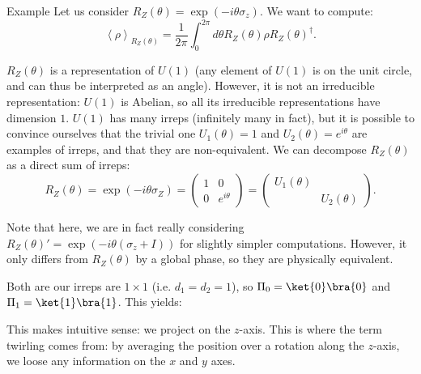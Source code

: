 \documentclass[a4paper]{article}
\begin{document}
\begin{parag}{Example}
    Let us consider $R_Z\left(\theta\right) = \exp\left(-i \theta \sigma_z\right)$.  We want to compute:
    \[\left\langle \rho \right\rangle_{R_Z\left(\theta\right)} = \frac{1}{2\pi} \int_{0}^{2\pi} d \theta R_Z\left(\theta\right) \rho R_Z\left(\theta\right)^{\dagger}.\]

    $R_Z\left(\theta\right)$ is a representation of $U\left(1\right)$ (any element of $U\left(1\right)$ is on the unit circle, and can thus be interpreted as an angle). However, it is not an irreducible representation: $U\left(1\right)$ is Abelian, so all its irreducible representations have dimension $1$. $U\left(1\right)$ has many irreps (infinitely many in fact), but it is possible to convince ourselves that the trivial one $U_1\left(\theta\right) = 1$ and $U_2\left(\theta\right) = e^{i \theta}$ are examples of irreps, and that they are non-equivalent. We can decompose $R_Z\left(\theta\right)$ as a direct sum of irreps: 
    \[R_Z\left(\theta\right) = \exp\left(-i \theta \sigma_Z\right) = \begin{pmatrix} 1 & 0 \\ 0 & e^{i \theta} \end{pmatrix} = \begin{pmatrix} U_1\left(\theta\right) &  \\  & U_2\left(\theta\right) \end{pmatrix}.\]

    Note that here, we are in fact really considering $R_Z\left(\theta\right)' = \exp\left(-i \theta \left(\sigma_z + I\right)\right)$ for slightly simpler computations. However, it only differs from $R_Z\left(\theta\right)$ by a global phase, so they are physically equivalent.

    Both are our irreps are $1\times 1$ (i.e. $d_1 = d_2 = 1$), so $\Pi_0 = \ket{0}\bra{0}$ and $\Pi_1 = \ket{1}\bra{1}$. This yields: 
    
    This makes intuitive sense: we project on the $z$-axis. This is where the term twirling comes from: by averaging the position over a rotation along the $z$-axis, we loose any information on the $x$ and $y$ axes.
\end{parag}
\end{document}
